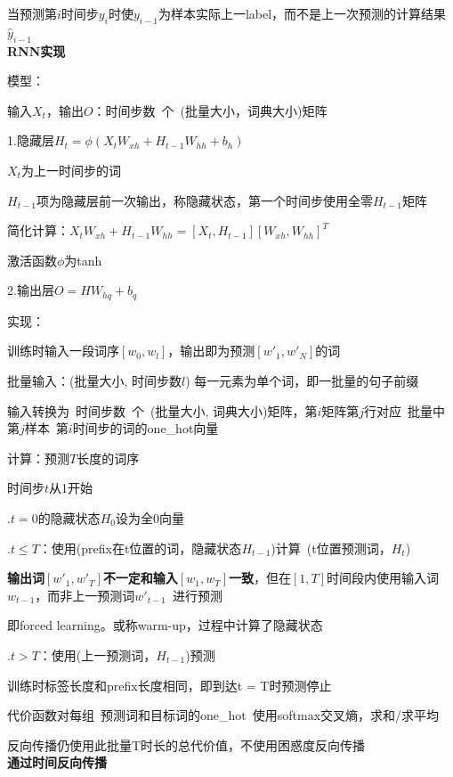 \documentclass[UTF8]{ctexart}
\begin{document}
  当预测第$i$时间步$y_i$时使$y_{i-1}$为样本实际上一label，而不是上一次预测的计算结果$\hat{y}_{i-1}$\\
\textbf{RNN实现}

  模型：

  \quad 输入$X_t$，输出$O$：时间步数\ 个\ (批量大小，词典大小)矩阵

  \quad 1.隐藏层$H_t = \phi(X_tW_{xh} + H_{t-1}W_{hh} + b_h)$

  \quad \quad $X_t$为上一时间步的词

  \quad \quad $H_{t-1}$项为隐藏层前一次输出，称隐藏状态，第一个时间步使用全零$H_{t-1}$矩阵

  \quad \quad 简化计算：$X_tW_{xh} + H_{t-1}W_{hh} = [X_t, H_{t-1}][W_{xh}, W_{hh}]^T$

  \quad \quad 激活函数$\phi$为tanh

  \quad 2.输出层$O = HW_{hq} + b_q$
  
  实现：

  \quad 训练时输入一段词序$[w_{0}, w_{l}]$，输出即为预测$[w'_{1}, w'_N]$的词
  
  \quad 批量输入：(批量大小, 时间步数$l$) 每一元素为单个词，即一批量的句子前缀
  
  \quad \quad 输入转换为\ 时间步数\ 个\ (批量大小, 词典大小)矩阵，第$i$矩阵第$j$行对应\ 批量中第$j$样本\ 第$i$时间步的词的one\_hot向量
    
  \quad 计算：预测$T$长度的词序

  \quad \quad 时间步$t$从1开始

  \quad {}.$t = 0$的隐藏状态$H_0$设为全0向量

  \quad {}.$t \leq T$：使用(prefix在t位置的词，隐藏状态$H_{t-1}$)计算\ (t位置预测词，$H_t$)

  \quad \quad \quad \textbf{输出词$[w'_{1}, w'_{T}]$不一定和输入$[w_1, w_T]$一致}，但在$[1, T]$时间段内使用输入词$w_{t-1}$，而非上一预测词$w'_{t-1}$\ 进行预测

  \quad \quad \quad 即forced learning。或称warm-up，过程中计算了隐藏状态
  
  \quad {}.$t > T$：使用(上一预测词，$H_{t-1}$)预测

  \quad \quad \quad 训练时标签长度和prefix长度相同，即到达t = T时预测停止
  
  \quad \quad 代价函数对每组\ 预测词和目标词的one\_hot\ 使用softmax交叉熵，求和/求平均
  
  \quad \quad \quad 反向传播仍使用此批量T时长的总代价值，不使用困惑度反向传播\\
\textbf{通过时间反向传播}
\end{document}
